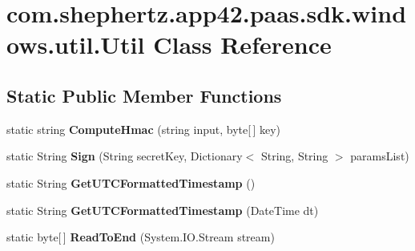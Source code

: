 \hypertarget{classcom_1_1shephertz_1_1app42_1_1paas_1_1sdk_1_1windows_1_1util_1_1_util}{\section{com.\+shephertz.\+app42.\+paas.\+sdk.\+windows.\+util.\+Util Class Reference}
\label{classcom_1_1shephertz_1_1app42_1_1paas_1_1sdk_1_1windows_1_1util_1_1_util}
}
\subsection*{Static Public Member Functions}
\begin{DoxyCompactItemize}
\item 
\hypertarget{classcom_1_1shephertz_1_1app42_1_1paas_1_1sdk_1_1windows_1_1util_1_1_util_a88af069d4e91fbf031bc1e086ef43868}{static string {\bfseries Compute\+Hmac} (string input, byte\mbox{[}$\,$\mbox{]} key)}\label{classcom_1_1shephertz_1_1app42_1_1paas_1_1sdk_1_1windows_1_1util_1_1_util_a88af069d4e91fbf031bc1e086ef43868}

\item 
\hypertarget{classcom_1_1shephertz_1_1app42_1_1paas_1_1sdk_1_1windows_1_1util_1_1_util_a1c7d961b9d1534c98bbe35421a948ef3}{static String {\bfseries Sign} (String secret\+Key, Dictionary$<$ String, String $>$ params\+List)}\label{classcom_1_1shephertz_1_1app42_1_1paas_1_1sdk_1_1windows_1_1util_1_1_util_a1c7d961b9d1534c98bbe35421a948ef3}

\item 
\hypertarget{classcom_1_1shephertz_1_1app42_1_1paas_1_1sdk_1_1windows_1_1util_1_1_util_aa3bc333c905386ecffb6cab4a2f41ed9}{static String {\bfseries Get\+U\+T\+C\+Formatted\+Timestamp} ()}\label{classcom_1_1shephertz_1_1app42_1_1paas_1_1sdk_1_1windows_1_1util_1_1_util_aa3bc333c905386ecffb6cab4a2f41ed9}

\item 
\hypertarget{classcom_1_1shephertz_1_1app42_1_1paas_1_1sdk_1_1windows_1_1util_1_1_util_a1ff58c22b9549c482d2832d0d95f8ba0}{static String {\bfseries Get\+U\+T\+C\+Formatted\+Timestamp} (Date\+Time dt)}\label{classcom_1_1shephertz_1_1app42_1_1paas_1_1sdk_1_1windows_1_1util_1_1_util_a1ff58c22b9549c482d2832d0d95f8ba0}

\item 
\hypertarget{classcom_1_1shephertz_1_1app42_1_1paas_1_1sdk_1_1windows_1_1util_1_1_util_aa381449f050ce9454ef2e9e353fc4408}{static byte\mbox{[}$\,$\mbox{]} {\bfseries Read\+To\+End} (System.\+I\+O.\+Stream stream)}\label{classcom_1_1shephertz_1_1app42_1_1paas_1_1sdk_1_1windows_1_1util_1_1_util_aa381449f050ce9454ef2e9e353fc4408}


\end{DoxyCompactItemize}
